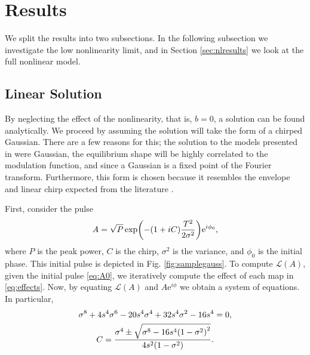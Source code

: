 \documentclass[9pt,twocolumn,twoside]{osajnl}
\let\originalleft\left
\let\originalright\right
\renewcommand{\left}{\mathopen{}\mathclose\bgroup\originalleft}
\renewcommand{\right}{\aftergroup\egroup\originalright}
\begin{document}
\section{Results}
\label{sec:results}
We split the results into two subsections. In the following subsection we investigate the low nonlinearity limit, and in Section \ref{sec:nlresults} we look at the full nonlinear model.

\subsection{Linear Solution}
By neglecting the effect of the nonlinearity, that is, $b = 0$, a solution can be found analytically. We proceed by assuming the solution will take the form of a chirped Gaussian. There are a few reasons for this; the solution to the models presented in \cite{cutler1955, siegman1969, kuizenga1970a, martinez1984, martinez1985} were Gaussian, the equilibrium shape will be highly correlated to the modulation function, and since a Gaussian is a fixed point of the Fourier transform. Furthermore, this form is chosen because it resembles the envelope and linear chirp expected from the literature \cite{burgoyne2014, haus1975, haus1996, haus2000, usechak2005}.

First, consider the pulse
\begin{align}
	A = \sqrt{P} \exp \left( -(1 + iC) \frac{T^2}{2 \sigma^2} \right) \textrm{e}^{i \phi_0},
	\label{eq:A0}
\end{align}
where $P$ is the peak power, $C$ is the chirp, $\sigma^2$ is the variance, and $\phi_0$ is the initial phase. This initial pulse is depicted in Fig. \ref{fig:samplegauss}. To compute $\mathcal{L}(A)$, given the initial pulse \eqref{eq:A0}, we iteratively compute the effect of each map in \eqref{eq:effects}. Now, by equating $\mathcal{L}(A)$ and $A \textrm{e}^{i \phi}$ we obtain a system of equations. In particular,
\begin{gather}
	\sigma^8 + 4 s^4 \sigma^6 - 20 s^4 \sigma^4 + 32 s^4 \sigma^2 - 16 s^4 = 0, \label{eq:var} \\
	C = \frac{\sigma^4 \pm \sqrt{\sigma^8 - 16 s^4 \left( 1 - \sigma^2 \right)^2}}{4 s^2 \left( 1 - \sigma^2 \right)}.
	\label{eq:chirp}
\end{gather}
\end{document}
